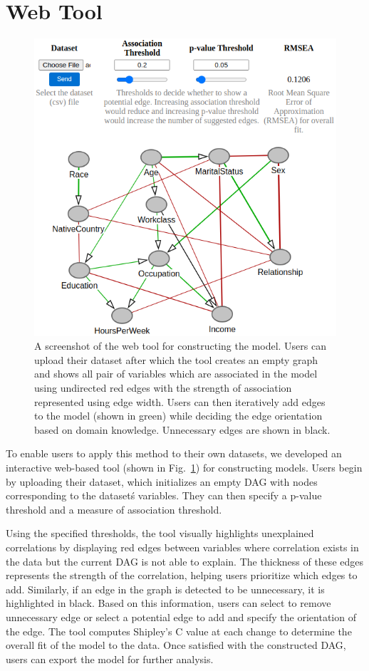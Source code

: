 \documentclass{uai2025} %
\begin{document}
\section{Web Tool}
\label{sec:web}

\begin{figure}[t!]
	\centering
	\includegraphics[scale=0.4]{../code/plots/web_tool_full_new.png}
	\caption{A screenshot of the web tool for constructing the model. Users
		can upload their dataset after which the tool creates an empty
		graph and shows all pair of variables which are associated in
		the model using undirected red edges with the strength of
		association represented using edge width. Users can then
		iteratively add edges to the model (shown in green) while
		deciding the edge orientation based on domain knowledge.
		Unnecessary edges are shown in black.}
	\label{fig:web}
\end{figure}

To enable users to apply this method to their own datasets, we developed an
interactive web-based tool (shown in Fig.~\ref{fig:web}) for constructing
models. Users begin by uploading their dataset, which initializes an empty DAG
with nodes corresponding to the dataset\'s variables. They can then specify a
p-value threshold and a measure of association threshold.

Using the specified thresholds, the tool visually highlights unexplained
correlations by displaying red edges between variables where correlation exists
in the data but the current DAG is not able to explain. The thickness of these
edges represents the strength of the correlation, helping users prioritize
which edges to add. Similarly, if an edge in the graph is detected to be
unnecessary, it is highlighted in black. Based on this information, users can
select to remove unnecessary edge or select a potential edge to add and specify
the orientation of the edge. The tool computes Shipley’s C \citep{Shipley2000}
value at each change to determine the overall fit of the model to the data.
Once satisfied with the constructed DAG, users can export the model for further
analysis.
\end{document}
